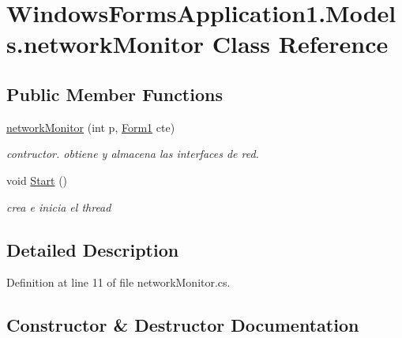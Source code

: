 \hypertarget{class_windows_forms_application1_1_1_models_1_1network_monitor}{}\section{Windows\+Forms\+Application1.\+Models.\+network\+Monitor Class Reference}
\label{class_windows_forms_application1_1_1_models_1_1network_monitor}
\subsection*{Public Member Functions}
\begin{DoxyCompactItemize}
\item 
\hyperlink{class_windows_forms_application1_1_1_models_1_1network_monitor_a47394bbe882034e4aa0176447f63ac18}{network\+Monitor} (int p, \hyperlink{class_windows_forms_application1_1_1_form1}{Form1} cte)
\begin{DoxyCompactList}\small\item\em contructor. obtiene y almacena las interfaces de red. \end{DoxyCompactList}\item 
void \hyperlink{class_windows_forms_application1_1_1_models_1_1network_monitor_a68fc1d2e7fea38e56b414ea25e378d2c}{Start} ()
\begin{DoxyCompactList}\small\item\em crea e inicia el thread \end{DoxyCompactList}\end{DoxyCompactItemize}


\subsection{Detailed Description}


Definition at line 11 of file network\+Monitor.\+cs.



\subsection{Constructor \& Destructor Documentation}
\hypertarget{class_windows_forms_application1_1_1_models_1_1network_monitor_a47394bbe882034e4aa0176447f63ac18}{}
